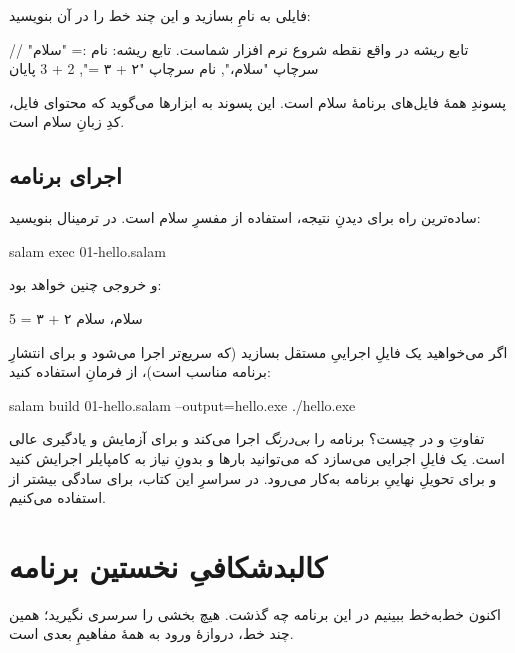 فایلی به نامِ  بسازید و این چند خط را در آن بنویسید:

\begin{salamfa}
// تابع ریشه در واقع نقطه شروع نرم افزار شماست.
تابع ریشه:
    نام := "سلام"
    سرچاپ "سلام،", نام
    سرچاپ "۲ + ۳ =", 2 + 3
پایان
\end{salamfa}

\begin{note}
پسوندِ همهٔ فایل‌های برنامهٔ سلام  است. این پسوند به ابزارها
می‌گوید که محتوای فایل، کدِ زبانِ سلام است.
\end{note}

\subsection{اجرای برنامه}

ساده‌ترین راه برای دیدنِ نتیجه، استفاده از مفسرِ سلام است. در ترمینال بنویسید:

\begin{salamen}[language={}]
salam exec 01-hello.salam
\end{salamen}

و خروجی چنین خواهد بود:

\begin{salamen}[language={}]
سلام، سلام
۲ + ۳ = 5
\end{salamen}

اگر می‌خواهید یک فایلِ اجراییِ مستقل بسازید (که سریع‌تر اجرا می‌شود و برای
انتشارِ برنامه مناسب است)، از فرمانِ  استفاده کنید:

\begin{salamen}[language={}]
salam build 01-hello.salam --output=hello.exe
./hello.exe
\end{salamen}

\begin{tip}
تفاوتِ  و  در چیست؟  برنامه را
\emph{بی‌درنگ} اجرا می‌کند و برای آزمایش و یادگیری عالی است.  یک
فایلِ اجرایی می‌سازد که می‌توانید بارها و بدونِ نیاز به کامپایلر اجرایش کنید و
برای تحویلِ نهاییِ برنامه به‌کار می‌رود. در سراسرِ این کتاب، برای سادگی بیشتر
از  استفاده می‌کنیم.
\end{tip}

\section{کالبدشکافیِ نخستین برنامه}

اکنون خط‌به‌خط ببینیم در این برنامه چه گذشت. هیچ بخشی را سرسری نگیرید؛ همین
چند خط، دروازهٔ ورود به همهٔ مفاهیمِ بعدی است.

